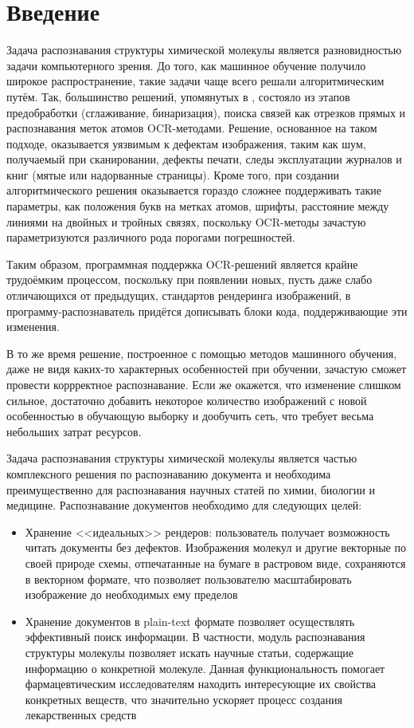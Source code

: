 \chapter*{Введение} %


Задача распознавания структуры химической молекулы является разновидностью задачи компьютерного зрения. До того, как машинное обучение получило широкое распространение, такие задачи чаще всего решали алгоритмическим путём. Так, большинство решений, упомянутых в \cite{rajan2020review}, состояло из этапов предобработки (сглаживание, бинаризация), поиска связей как отрезков прямых и распознавания меток атомов OCR-методами. Решение, основанное на таком подходе, оказывается уязвимым к дефектам изображения, таким как шум, получаемый при сканировании, дефекты печати, следы эксплуатации журналов и книг (мятые или надорванные страницы). Кроме того, при создании алгоритмического решения оказывается гораздо сложнее поддерживать такие параметры, как положения букв на метках атомов,
шрифты, расстояние между линиями на двойных и тройных связях,
поскольку OCR-методы зачастую параметризуются различного рода порогами погрешностей.

Таким образом, программная поддержка OCR-решений является крайне трудоёмким процессом, поскольку при появлении новых, пусть даже слабо отличающихся от предыдущих, стандартов рендеринга изображений, в программу-распознаватель придётся дописывать блоки кода, поддерживающие эти изменения.

В то же время решение, построенное с помощью методов машинного обучения, даже не видя каких-то характерных особенностей при обучении, зачастую сможет провести коррректное распознавание. Если же окажется, что изменение слишком сильное, достаточно добавить некоторое количество изображений с новой особенностью в обучающую выборку и дообучить сеть, что требует весьма небольших затрат ресурсов.

Задача распознавания структуры химической молекулы является частью комплексного решения по распознаванию документа и необходима преимущественно для распознавания научных статей по химии, биологии и медицине. Распознавание документов необходимо для следующих целей:
\begin{itemize}
	\item Хранение <<идеальных>> рендеров: пользователь получает возможность читать документы без дефектов. Изображения молекул и другие векторные по своей природе схемы, отпечатанные на бумаге в растровом виде, сохраняются в векторном формате, что позволяет пользователю масштабировать изображение до необходимых ему пределов
	
	\item Хранение документов в plain-text формате позволяет осуществлять эффективный поиск информации. В частности, модуль распознавания структуры молекулы позволяет искать научные статьи, содержащие информацию о конкретной молекуле. Данная функциональность помогает фармацевтическим исследователям находить интересующие их свойства конкретных веществ, что значительно ускоряет процесс создания лекарственных средств
\end{itemize}

